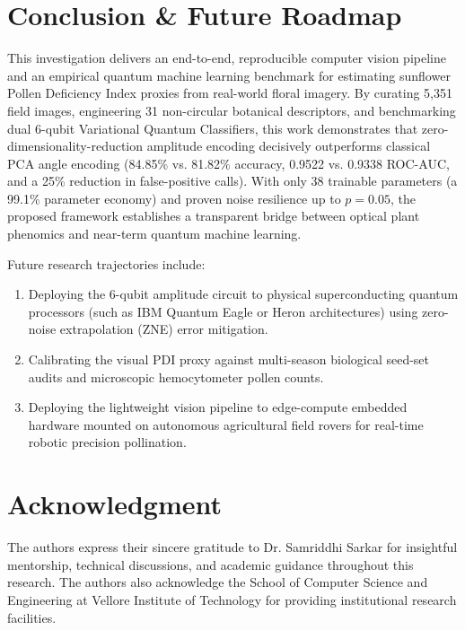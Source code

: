 \documentclass{ieeeaccess}
\begin{document}
\section{Conclusion \& Future Roadmap}
\label{sec:conclusion}
This investigation delivers an end-to-end, reproducible computer vision pipeline and an empirical quantum machine learning benchmark for estimating sunflower Pollen Deficiency Index proxies from real-world floral imagery. By curating 5,351 field images, engineering 31 non-circular botanical descriptors, and benchmarking dual 6-qubit Variational Quantum Classifiers, this work demonstrates that zero-dimensionality-reduction amplitude encoding decisively outperforms classical PCA angle encoding (84.85\% vs. 81.82\% accuracy, 0.9522 vs. 0.9338 ROC-AUC, and a 25\% reduction in false-positive calls). With only 38 trainable parameters (a 99.1\% parameter economy) and proven noise resilience up to $p = 0.05$, the proposed framework establishes a transparent bridge between optical plant phenomics and near-term quantum machine learning.

Future research trajectories include:
\begin{enumerate}
    \item Deploying the 6-qubit amplitude circuit to physical superconducting quantum processors (such as IBM Quantum Eagle or Heron architectures) using zero-noise extrapolation (ZNE) error mitigation.
    \item Calibrating the visual PDI proxy against multi-season biological seed-set audits and microscopic hemocytometer pollen counts.
    \item Deploying the lightweight vision pipeline to edge-compute embedded hardware mounted on autonomous agricultural field rovers for real-time robotic precision pollination.
\end{enumerate}

\section*{Acknowledgment}
The authors express their sincere gratitude to Dr. Samriddhi Sarkar for insightful mentorship, technical discussions, and academic guidance throughout this research. The authors also acknowledge the School of Computer Science and Engineering at Vellore Institute of Technology for providing institutional research facilities.
\end{document}

